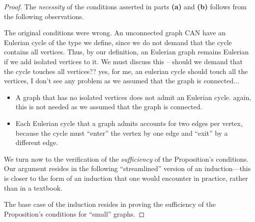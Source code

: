 \begin{proof}
The {\em necessity} of the conditions asserted in parts {\bf (a)} and {\bf (b)} follows from
the following observations.  

{\Arny The original conditions were wrong.  An unconnected
graph CAN have an Eulerian cycle of the type we define, since we do not demand that 
the cycle contains all vertices.  Thus, by our definition, an Eulerian graph remains Eulerian 
if we add isolated vertices to it.  We must discuss this -- should we demand that the cycle
touches all vertices??}
{\Denis yes, for me, an eulerian cycle should touch all the vertices, I don't see any problem 
as we assumed that the graph is connected...}

\begin{itemize}
\item
A graph that has no isolated vertices does not admit an Eulerian cycle.
{\Denis again, this is not needed as we assumed that the graph is connected.}
\item
Each Eulerian cycle that a graph admits accounts for two edges per vertex,
because the cycle must ``enter'' the vertex by one edge and ``exit'' by a different edge.
\end{itemize}

\smallskip

\noindent
We turn now to the verification of the {\em sufficiency} of the
Proposition's conditions.  Our argument resides in the following
``streamlined'' version of an induction---this is closer to the form
of an induction that one would encounter in practice, rather than in a
textbook.

The base case of the induction resides in proving the sufficiency of
the Proposition's conditions for ``small'' graphs.  
\bigskip

\noindent {}



\end{proof}
